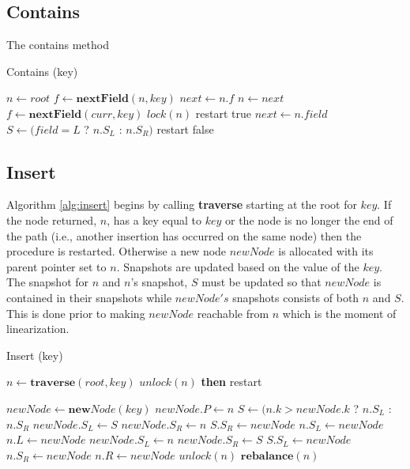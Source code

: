 \documentclass[11pt]{article}
\theoremstyle{definition}
\theoremstyle{theorem}
\begin{document}
\subsection{Contains}
The contains method
\begin{algorithm}[H]
\caption{Contains (key)}
\label{alg:contains}
\begin{algorithmic}[1]
\State $n\gets root$
\State $f \gets \mathbf{nextField}(n, key)$
\State $next \gets n.f$
  \State $n\gets next$
  \State $f \gets \mathbf{nextField}(curr, key)$
  	\State $lock(n)$
  		\State restart
  	\EndIf
  	\State \Return true
	\EndIf
	\State $next \gets n.field$
\EndWhile
\State $S \gets (field = L$ ? $n.S_L$ : $n.S_R)$
 \label{alg:contains:snap}
\State restart
\EndIf
\State \Return false
\end{algorithmic}
\end{algorithm}

\subsection{Insert}
Algorithm \ref{alg:insert} begins by calling \textbf{traverse} starting at the root for $key$. If the node returned, $n$, has a key equal to $key$ or the node is no longer the end of the path (i.e., another insertion has occurred on the same node) then the procedure is restarted. Otherwise a new node $newNode$ is allocated with its parent pointer set to $n$. Snapshots are updated based on the value of the $key$. The snapshot for $n$ and $n$'s snapshot, $S$ must be updated so that $newNode$ is contained in their snapshots while $newNode's$ snapshots consists of both $n$ and $S$. This is done prior to making $newNode$ reachable from $n$ which is the moment of linearization. 
\begin{algorithm}[H]
\caption{Insert (key)}
\label{alg:insert}
\begin{algorithmic}[1]
\State $n\gets \mathbf{traverse}(root, key)$
	\State $unlock(n)$ \textbf{then} restart
\EndIf

\State $newNode\gets \mathbf{new} Node(key)$
\State $newNode.P \gets n$
\State $S \gets (n.k > newNode.k$ ? $n.S_L$ : $n.S_R$
\label{alg:insert:snaps}
	\State $newNode.S_L \gets S$
	\State $newNode.S_R \gets n$
	\State $S.S_R \gets newNode$
	\State $n.S_L \gets newNode$
	\State $n.L \gets newNode$
\Else
	\State $newNode.S_L \gets n$
	\State $newNode.S_R \gets S$
	\State $S.S_L \gets newNode$
	\State $n.S_R \gets newNode$
	\State $n.R \gets newNode$
\EndIf
\State $unlock(n)$
 $\mathbf{rebalance}(n)$
\EndIf
\end{algorithmic}
\end{algorithm}
\end{document}
